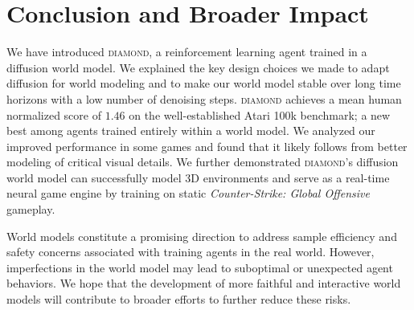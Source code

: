 \vspace{-2mm}
\section{Conclusion and Broader Impact}
\label{sec:conclusion}

We have introduced \textsc{diamond}, a reinforcement learning agent trained in a diffusion world model. 
We explained the key design choices we made to adapt diffusion for world modeling and to make our world model stable over long time horizons with a low number of denoising steps.
\textsc{diamond} achieves a mean human normalized score of $1.46$ on the well-established Atari 100k benchmark; a new best among agents trained entirely within a world model. 
We analyzed our improved performance in some games and found that it likely follows from better modeling of critical visual details.
We further demonstrated \textsc{diamond}'s diffusion world model can successfully model 3D environments and serve as a real-time neural game engine by training on static \textit{Counter-Strike: Global Offensive} gameplay.

World models constitute a promising direction to address sample efficiency and safety concerns associated with training agents in the real world. However, imperfections in the world model may lead to suboptimal or unexpected agent behaviors. We hope that the development of more faithful and interactive world models will contribute to broader efforts to further reduce these risks.







